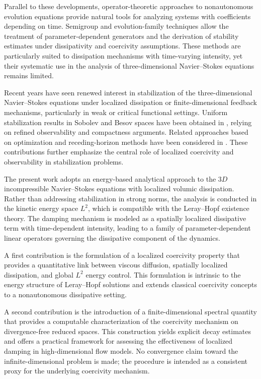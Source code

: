 \documentclass[preprint,12pt]{elsarticle}
\begin{document}
Parallel to these developments, operator-theoretic approaches to
nonautonomous evolution equations provide natural tools for analyzing
systems with coefficients depending on time.
Semigroup and evolution-family techniques \cite{Kato1970,Pazy1983}
allow the treatment of parameter-dependent generators and the derivation
of stability estimates under dissipativity and coercivity assumptions.
These methods are particularly suited to dissipation mechanisms with
time-varying intensity, yet their systematic use in the analysis of
three-dimensional Navier--Stokes equations remains limited.

Recent years have seen renewed interest in stabilization of the
three-dimensional Navier--Stokes equations under localized dissipation or
finite-dimensional feedback mechanisms, particularly in weak or critical
functional settings.
Uniform stabilization results in Sobolev and Besov spaces have been obtained in
\cite{LasieckaPiyasadTriggiani2019,LasieckaPriyasadTriggiani2021}, relying on
refined observability and compactness arguments.
Related approaches based on optimization and receding-horizon methods have been
considered in \cite{Azmi2022}.
These contributions further emphasize the central role of localized coercivity
and observability in stabilization problems.

\medskip

The present work adopts an energy-based analytical approach to the
$3D$ incompressible Navier--Stokes equations with localized
volumic dissipation.
Rather than addressing stabilization in strong norms, the analysis is conducted
in the kinetic energy space $L^2$, which is compatible with the Leray--Hopf
existence theory.
The damping mechanism is modeled as a spatially localized dissipative term with
time-dependent intensity, leading to a family of parameter-dependent linear
operators governing the dissipative component of the dynamics.

A first contribution is the formulation of a localized coercivity property that
provides a quantitative link between viscous diffusion, spatially localized
dissipation, and global $L^2$ energy control.
This formulation is intrinsic to the energy structure of Leray--Hopf solutions
and extends classical coercivity concepts to a nonautonomous dissipative setting.

A second contribution is the introduction of a finite-dimensional spectral
quantity that provides a computable characterization of the coercivity mechanism
on divergence-free reduced spaces.
This construction yields explicit decay estimates and offers a practical
framework for assessing the effectiveness of localized damping in
high-dimensional flow models.
No convergence claim toward the infinite-dimensional problem is made; the
procedure is intended as a consistent proxy for the underlying coercivity
mechanism.
\end{document}
